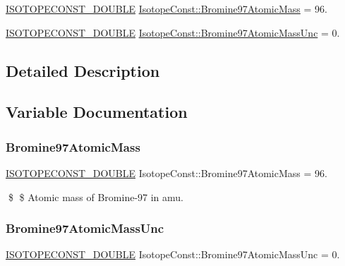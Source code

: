 \begin{DoxyCompactItemize}
\item 
\mbox{\hyperlink{group___isotope_const-_macros_ga8f45a7272ce02c0b4c65c44636ed719a}{I\+S\+O\+T\+O\+P\+E\+C\+O\+N\+S\+T\+\_\+\+D\+O\+U\+B\+LE}} \mbox{\hyperlink{group___isotope_const-_bromine-_br97_ga7073be7ce8bc92de8c76a0055a52438a}{Isotope\+Const\+::\+Bromine97\+Atomic\+Mass}} = 96.
\item 
\mbox{\hyperlink{group___isotope_const-_macros_ga8f45a7272ce02c0b4c65c44636ed719a}{I\+S\+O\+T\+O\+P\+E\+C\+O\+N\+S\+T\+\_\+\+D\+O\+U\+B\+LE}} \mbox{\hyperlink{group___isotope_const-_bromine-_br97_ga346e8db074e9e87bd8aff89144b040f4}{Isotope\+Const\+::\+Bromine97\+Atomic\+Mass\+Unc}} = 0.
\end{DoxyCompactItemize}


\subsection{Detailed Description}


\subsection{Variable Documentation}
\mbox{\label{group___isotope_const-_bromine-_br97_ga7073be7ce8bc92de8c76a0055a52438a}} 
\subsubsection{\texorpdfstring{Bromine97\+Atomic\+Mass}{Bromine97AtomicMass}}
{\footnotesize\ttfamily \mbox{\hyperlink{group___isotope_const-_macros_ga8f45a7272ce02c0b4c65c44636ed719a}{I\+S\+O\+T\+O\+P\+E\+C\+O\+N\+S\+T\+\_\+\+D\+O\+U\+B\+LE}} Isotope\+Const\+::\+Bromine97\+Atomic\+Mass = 96.}

\$ \$ Atomic mass of Bromine-\/97 in amu. \mbox{\label{group___isotope_const-_bromine-_br97_ga346e8db074e9e87bd8aff89144b040f4}} 
\subsubsection{\texorpdfstring{Bromine97\+Atomic\+Mass\+Unc}{Bromine97AtomicMassUnc}}
{\footnotesize\ttfamily \mbox{\hyperlink{group___isotope_const-_macros_ga8f45a7272ce02c0b4c65c44636ed719a}{I\+S\+O\+T\+O\+P\+E\+C\+O\+N\+S\+T\+\_\+\+D\+O\+U\+B\+LE}} Isotope\+Const\+::\+Bromine97\+Atomic\+Mass\+Unc = 0.}

